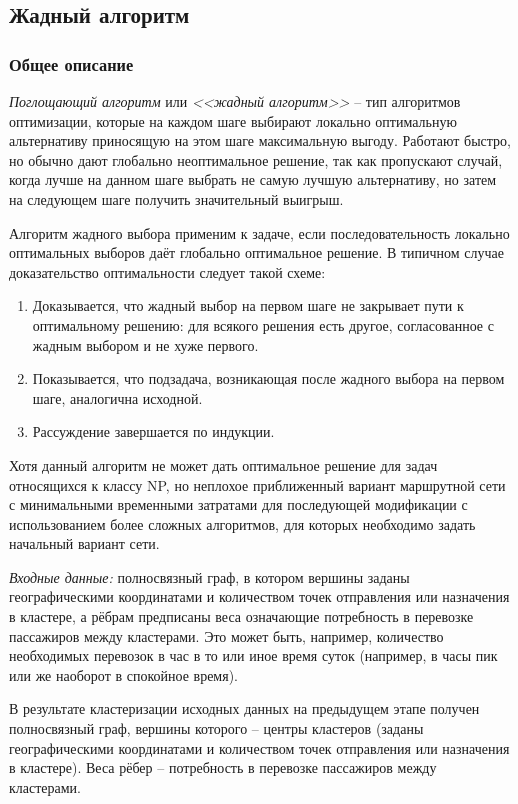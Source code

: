 \clearpage

\subsection{Жадный алгоритм}\label{sec:greedy-alg}
\subsubsection{Общее описание}
\emph{Поглощающий алгоритм} или \emph{<<жадный алгоритм>>} -- тип алгоритмов оптимизации, которые на каждом 
шаге выбирают локально оптимальную альтернативу приносящую на этом шаге максимальную выгоду. Работают быстро, 
но обычно дают глобально неоптимальное решение, так как пропускают случай, когда лучше на данном шаге выбрать 
не самую лучшую альтернативу, но затем на следующем шаге получить значительный выигрыш.

Алгоритм жадного выбора применим к задаче, если последовательность локально оптимальных выборов даёт глобально 
оптимальное решение. В типичном случае доказательство оптимальности следует такой схеме:
\begin{enumerate}
    \item Доказывается, что жадный выбор на первом шаге не закрывает пути к оптимальному решению: для всякого решения 
        есть другое, согласованное с жадным выбором и не хуже первого.
    \item Показывается, что подзадача, возникающая после жадного выбора на первом шаге, аналогична исходной.
    \item Рассуждение завершается по индукции.
\end{enumerate}

Хотя данный алгоритм не может дать оптимальное решение для задач относящихся к классу NP, но неплохое 
приближенный вариант маршрутной сети с минимальными временными затратами для последующей модификации с 
использованием более сложных алгоритмов, для которых необходимо задать начальный вариант сети.

\emph{Входные данные:} полносвязный граф, в котором вершины заданы географическими координатами и количеством 
точек отправления или назначения в кластере, а рёбрам предписаны веса означающие потребность в перевозке 
пассажиров между кластерами. Это может быть, например, количество необходимых перевозок в час в то или иное 
время суток (например, в часы пик или же наоборот в спокойное время).

В результате кластеризации исходных данных на предыдущем этапе получен полносвязный граф, вершины 
которого -- центры кластеров (заданы географическими координатами и количеством точек отправления или 
назначения в кластере). Веса рёбер -- потребность в перевозке пассажиров между кластерами. 

